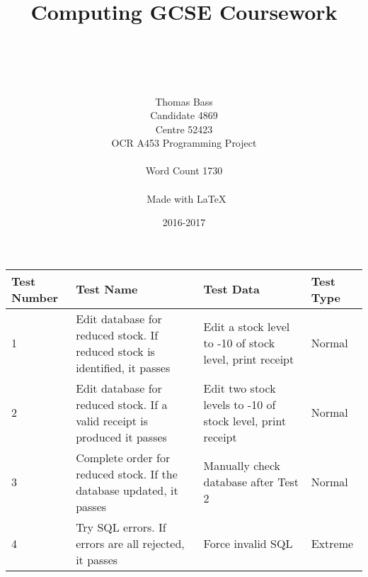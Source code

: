 \documentclass[a4paper]{article}
\title{Computing GCSE Coursework}
\author{\\ \\ \\ \\ Thomas Bass\\Candidate 4869\\Centre 52423\\OCR A453 Programming Project\\\\ Word Count 1730 \\\\\ Made with \LaTeX}
\date{2016-2017}
\begin{document}
\begin{center}
\begin{tabular}{ | m{4em} | m{19em} | m{10em} | m{5em} | }
  \hline
  Test Number & Test Name & Test Data & Test Type	\\ [0.5ex] 
  \hline\hline
  1 & Edit database for reduced stock. If reduced stock is identified, it passes & Edit a stock level to -10 of stock level, print receipt & Normal \\
  \hline
  2 & Edit database for reduced stock. If a valid receipt is produced it passes & Edit two stock levels to -10 of stock level, print receipt & Normal \\
  \hline
  3 & Complete order for reduced stock. If the database updated, it passes & Manually check database after Test 2 & Normal \\
  \hline
  4 & Try SQL errors. If errors are all rejected, it passes & Force invalid SQL & Extreme \\
  \hline
\end{tabular}
\end{center}
\end{document}
